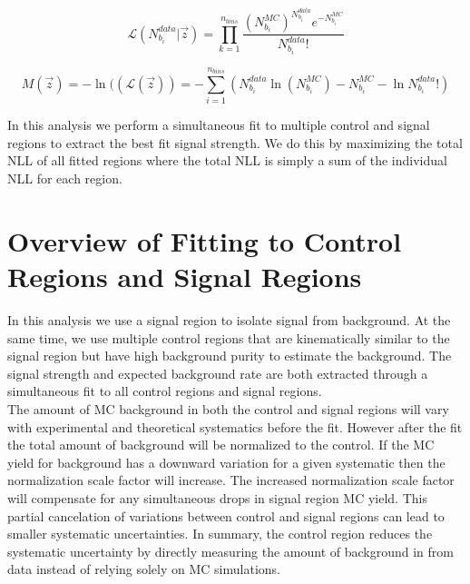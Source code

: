 \begin{equation}
\label{eqn:binnedlikelihood2}
{\mathcal{L}}(N^{data}_{b_i}|\vec{z}) = {\displaystyle\prod_{k=1}^{n_{bins}} \frac{(N^{MC}_{b_i})^{N^{data}_{b_i}}e^{-N^{MC}_{b_i}}}{N^{data}_{b_i}!}}
\end{equation}

\begin{equation}
\label{eqn:binnedNLL2}
M(\vec{z})=-\ln(({\mathcal{L}}(\vec{z})) = -{\displaystyle\sum_{i=1}^{n_{bins}}} ( N^{data}_{b_i} \ln( N^{MC}_{b_i} ) - N^{MC}_{b_i} - \ln{N^{data}_{b_i}!} )
\end{equation}

\indent In this analysis we perform a simultaneous fit to multiple control and signal regions to extract the best fit signal strength.  We do this by maximizing the total NLL of all fitted regions where the total NLL is simply a sum of the individual NLL for each region.  \\

\section{Overview of Fitting to Control Regions and Signal Regions}
\label{sec:stat:Bkg}

\indent In this analysis we use a signal region to isolate signal from background.  At the same time, we use multiple control regions that are kinematically similar to the signal region but have high background purity to estimate the background.  The signal strength and expected background rate are both extracted through a simultaneous fit to all control regions and signal regions.  \\


\indent The amount of MC background in both the control and signal regions will vary with experimental and theoretical systematics before the fit.  However after the fit the total amount of background will be normalized to the control.  If the MC yield for background has a downward variation for a given systematic then the normalization scale factor will increase.  The increased normalization scale factor will compensate for any simultaneous drops in signal region MC yield.  This partial cancelation of variations between control and signal regions can lead to smaller systematic uncertainties.  In summary, the control region reduces the systematic uncertainty by directly measuring the amount of background in from data instead of relying solely on MC simulations.  \\

